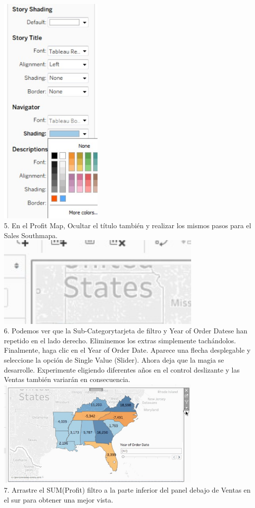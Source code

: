 \documentclass[preprint,12pt]{elsarticle}
\begin{document}
\begin{itemize}
			\\	\includegraphics[width=5cm]{./IMAGENES/7.1.2.5}
		\\ 5. En el Profit Map, Ocultar el título también y realizar los mismos pasos para el Sales
		Southmapa.
			\\	\includegraphics[width=10cm]{./IMAGENES/7.1.3}
		\\ 6. Podemos ver que la Sub-Categorytarjeta de filtro y Year of Order Datese han repetido
		en el lado derecho. Eliminemos los extras simplemente tachándolos. Finalmente, haga clic en
		el Year of Order Date. Aparece una flecha desplegable y seleccione la opción de Single 
		Value (Slider). Ahora deja que la magia se desarrolle. Experimente eligiendo diferentes
		años en el control deslizante y las Ventas también variarán en consecuencia.
		 	\\	\includegraphics[width=10cm]{./IMAGENES/7.1.4}
		\\ 7. Arrastre el SUM(Profit) filtro a la parte inferior del panel debajo de Ventas en el sur para
		obtener una mejor vista.
		

\end{itemize}
\end{document}
